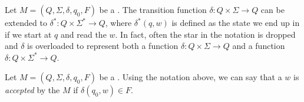 \begin{definition} \label{definition:Extended-transition-function}
Let $M = (Q, \Sigma, \delta, q_0, F)$ be a . The transition function $\delta : Q \times \Sigma \to Q$ can be extended to $\delta^* : Q \times \Sigma^* \to Q$, where $\delta^*(q, w)$ is defined as the state we end up in if we start at $q$ and read the  $w$. In fact, often the star in the notation is dropped and $\delta$ is overloaded to represent both a function $\delta : Q \times \Sigma \to Q$ and a function $\delta : Q \times \Sigma^* \to Q$. 
\end{definition}

\begin{note} \label{note:Alternative-definition-of-a-DFA-accepting-a-string}
Let $M = (Q, \Sigma, \delta, q_0, F)$ be a . Using the notation above, we can say that a  $w$ is \emph{accepted} by the  $M$ if $\delta(q_0, w) \in F$.
\end{note}


